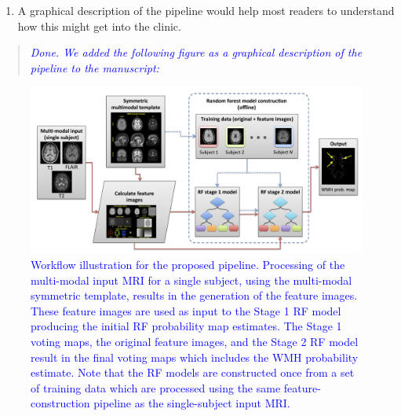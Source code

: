 \documentclass[12pt,]{article}
\providecommand{\tightlist}{%
  \setlength{\itemsep}{0pt}\setlength{\parskip}{0pt}}
\begin{document}
\begin{enumerate}
\def\labelenumi{\arabic{enumi}.}
\setcounter{enumi}{1}
\tightlist
\item
  A graphical description of the pipeline would help most readers to
  understand how this might get into the clinic.
\end{enumerate}

\begin{quote}
\emph{\textcolor{blue}{Done.  We added the following figure as a graphical description of
the pipeline to the manuscript:}}
\end{quote}

\begin{figure}[htbp]
\centering
\includegraphics{Figures/wmhPipeline.png}
\caption{\textcolor{blue}{Workflow illustration for the proposed pipeline.  Processing of the multi-modal
input MRI for a single subject, using the multi-modal symmetric template, results in
the generation of the feature images.  These feature images are used as input to the
Stage 1 RF model producing the initial RF probability map estimates.  The Stage 1
voting maps, the original feature images, and the Stage 2 RF model result in the
final voting maps which includes the WMH probability estimate.  Note that the RF models
are constructed once from a set of training data which are processed using the
same feature-construction pipeline as the single-subject input MRI.}}
\end{figure}

\hypertarget{refs}{}
\end{document}
